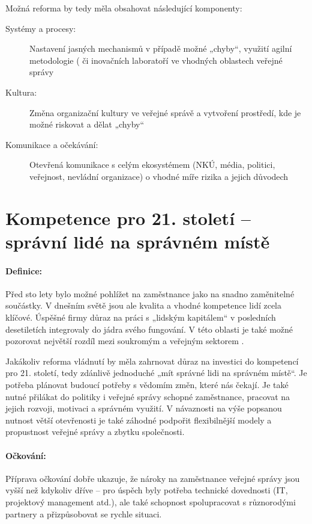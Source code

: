 Možná reforma by tedy měla obsahovat následující komponenty:

\begin{description}
  \item[Systémy a procesy:] Nastavení jasných mechanismů v případě možné „chyby“, využití agilní metodologie (\cite{christopher_blueprint_2021} či inovačních laboratoří ve vhodných oblastech veřejné správy \cite{cr2030_kvalita_udrzitelnost}
  \item[Kultura:] Změna organizační kultury ve veřejné správě a vytvoření prostředí, kde je možné riskovat a dělat „chyby“
  \item[Komunikace a očekávání:] Otevřená komunikace s celým ekosystémem (NKÚ, média, politici, veřejnost, nevládní organizace) o vhodné míře rizika a jejich důvodech
\end{description}

\section*{Kompetence pro 21. století -- správní lidé na správném místě}

\paragraph{Definice:} Před sto lety bylo možné pohlížet na zaměstnance jako na snadno zaměnitelné součástky. V dnešním světě jsou ale kvalita a vhodné kompetence lidí zcela klíčové. Úspěšné firmy důraz na práci s „lidským kapitálem“ v posledních desetiletích integrovaly do jádra svého fungování. V této oblasti je také možné pozorovat největší rozdíl mezi soukromým a veřejným sektorem \cite{d_eggers_future_2020}.

Jakákoliv reforma vládnutí by měla zahrnovat důraz na investici do kompetencí pro 21. století, tedy zdánlivě jednoduché „mít správné lidi na správném místě“. Je potřeba plánovat budoucí potřeby s vědomím změn, které nás čekají. Je také nutné přilákat do politiky i veřejné správy schopné zaměstnance, pracovat na jejich rozvoji, motivaci a správném využití. V návaznosti na výše popsanou nutnost větší otevřenosti je také záhodné podpořit flexibilnější modely a propustnost veřejné správy a zbytku společnosti.

\paragraph{Očkování:} Příprava očkování dobře ukazuje, že nároky na zaměstnance veřejné správy jsou vyšší než kdykoliv dříve -- pro úspěch byly potřeba technické dovednosti (IT, projektový management atd.), ale také schopnost spolupracovat s různorodými partnery a přizpůsobovat se rychle situaci. 

